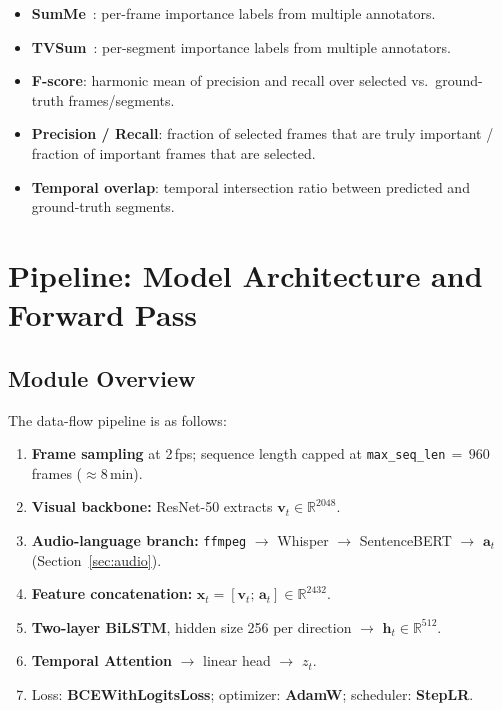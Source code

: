 \documentclass[10pt,conference]{IEEEtran}
\begin{document}
\begin{itemize}
  \item \textbf{SumMe}~\cite{gygli2014}: per-frame importance labels from
        multiple annotators.
  \item \textbf{TVSum}~\cite{song2015}: per-segment importance labels from
        multiple annotators.
  \item \textbf{F-score}: harmonic mean of precision and recall over selected
        vs.\ ground-truth frames/segments.
  \item \textbf{Precision / Recall}: fraction of selected frames that are
        truly important / fraction of important frames that are selected.
  \item \textbf{Temporal overlap}: temporal intersection ratio between
        predicted and ground-truth segments.
\end{itemize}

\section{Pipeline: Model Architecture and Forward Pass}
\label{sec:pipeline}

\subsection{Module Overview}

The data-flow pipeline is as follows:
\begin{enumerate}
  \item \textbf{Frame sampling} at 2\,fps; sequence length capped at
        \texttt{max\_seq\_len}$\,{=}\,960$ frames ($\approx$8\,min).
  \item \textbf{Visual backbone:} ResNet-50 extracts
        $\mathbf{v}_t \in \mathbb{R}^{2048}$.
  \item \textbf{Audio-language branch:} \texttt{ffmpeg} $\to$ Whisper $\to$
        SentenceBERT $\to$ $\mathbf{a}_t$ (Section~\ref{sec:audio}).
  \item \textbf{Feature concatenation:}
        $\mathbf{x}_t = [\mathbf{v}_t;\, \mathbf{a}_t] \in \mathbb{R}^{2432}$.
  \item \textbf{Two-layer BiLSTM}, hidden size 256 per direction
        $\to$ $\mathbf{h}_t \in \mathbb{R}^{512}$.
  \item \textbf{Temporal Attention} $\to$ linear head $\to$ $z_t$.
  \item Loss: \textbf{BCEWithLogitsLoss}; optimizer: \textbf{AdamW};
        scheduler: \textbf{StepLR}.
\end{enumerate}
\end{document}
